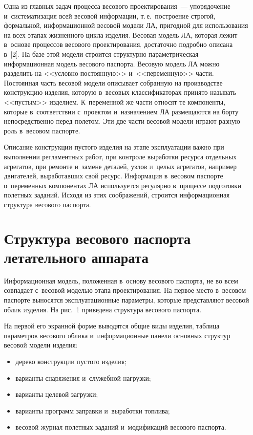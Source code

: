 \begin{multicols}{2}
Одна из главных задач процесса 
весового проектирования~--- упорядочение и~систематизация всей весовой 
информации, т.\,е.\ построение строгой, формальной, информационной весовой 
модели ЛА, пригодной для использования на всех этапах жизненного цик\-ла 
изделия. Весовая модель ЛА, которая лежит в~основе процессов весового 
проектирования, достаточно подробно описана в~[2]. На базе этой модели 
строится струк\-тур\-но-па\-ра\-мет\-ри\-че\-ская информационная модель весового 
паспорта. Весовую модель ЛА можно разделить на <<условно постоянную>> 
и~<<переменную>> части. По\-сто\-ян\-ная часть весовой модели описывает 
собранную на производстве конструкцию изделия, которую в~весовых 
классификаторах принято называть <<пустым>> изделием. К~переменной же 
части относят те компоненты, которые в~соответствии с~проектом 
и~назначением ЛА размещаются на борту непосредственно перед полетом. Эти 
две части весовой модели играют разную роль в~весовом паспорте. 

Описание 
конструкции пустого изделия на этапе эксплуатации важно при выполнении 
регламентных работ, при контроле выработки ресурса отдельных агрегатов, 
при ремонте и~замене деталей, узлов и~целых агрегатов, например двигателей, 
выработавших свой ресурс. Информация в~весовом паспорте о~переменных 
компонентах ЛА используется регулярно в~процессе подготовки полетных 
заданий. Исходя из этих соображений, строится информационная структура 
весового паспорта.

\vspace{-6pt}
  
\section{Структура весового паспорта летательного аппарата}

\vspace*{-2pt}

  Информационная модель, положенная в~основу весового паспорта, не во 
всем совпадает с~весовой моделью этапа проектирования. На первое место 
в~весовом паспорте выносятся эксплуатационные параметры, которые 
представляют весовой облик изделия. На рис.~1 приведена структура весового 
паспорта.
  

  На первой его экранной форме выводятся общие виды изделия, таблица 
параметров весового облика и~информационные панели основных структур 
весовой модели изделия:
  \begin{itemize}
\item  дерево конструкции пустого изделия;\\[-15pt]
\item варианты снаряжения и~служебной нагрузки;\\[-15pt]
\item варианты целевой загрузки;\\[-15pt]
\item варианты программ заправки и~выработки топлива;\\[-15pt]
\item весовой журнал полетных заданий и~модификаций весового паспорта.
\end{itemize}


\end{multicols}
